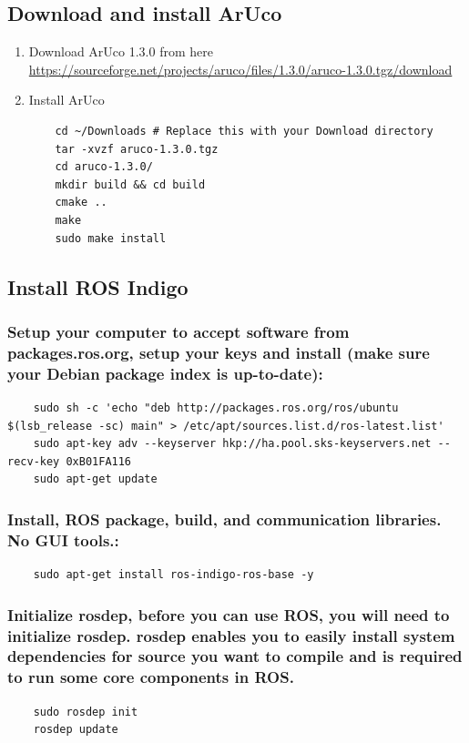 \documentclass{report}
\begin{document}
\subsection{Download and install ArUco}
\begin{enumerate}
	\item Download ArUco 1.3.0 from here \href{https://sourceforge.net/projects/aruco/files/1.3.0/aruco-1.3.0.tgz/download}{https://sourceforge.net/projects/aruco/files/1.3.0/aruco-1.3.0.tgz/download}
	
	\item Install ArUco

\begin{lstlisting}
	cd ~/Downloads # Replace this with your Download directory
	tar -xvzf aruco-1.3.0.tgz
	cd aruco-1.3.0/
	mkdir build && cd build
	cmake ..
	make
	sudo make install
\end{lstlisting}
\end{enumerate}

\subsection{Install ROS Indigo}
\subsubsection{Setup your computer to accept software from packages.ros.org, setup your keys and install (make sure your Debian package index is up-to-date):}
\begin{lstlisting}
	sudo sh -c 'echo "deb http://packages.ros.org/ros/ubuntu $(lsb_release -sc) main" > /etc/apt/sources.list.d/ros-latest.list'
	sudo apt-key adv --keyserver hkp://ha.pool.sks-keyservers.net --recv-key 0xB01FA116
	sudo apt-get update
\end{lstlisting}

\subsubsection{Install, ROS package, build, and communication libraries. No GUI tools.:}
\begin{lstlisting}
	sudo apt-get install ros-indigo-ros-base -y
\end{lstlisting}

\subsubsection{Initialize rosdep, before you can use ROS, you will need to initialize rosdep. rosdep enables you to easily install system dependencies for source you want to compile and is required to run some core components in ROS.}
\begin{lstlisting}
	sudo rosdep init
	rosdep update
\end{lstlisting}
\end{document}
